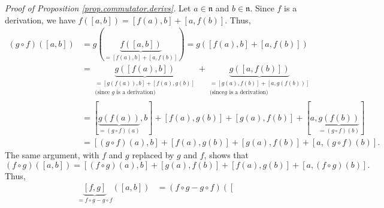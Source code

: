 \documentclass[etingof-lie.tex]{subfiles}
\begin{document}
\begin{verlong}
\textit{Proof of Proposition \ref{prop.commutator.derivs}.} Let $a\in
\mathfrak{n}$ and $b\in\mathfrak{n}$. Since $f$ is a derivation, we have
$f\left(  \left[  a,b\right]  \right)  =\left[  f\left(  a\right)  ,b\right]
+\left[  a,f\left(  b\right)  \right]  $. Thus,%
\begin{align*}
\left(  g\circ f\right)  \left(  \left[  a,b\right]  \right)   &  =g\left(
\underbrace{f\left(  \left[  a,b\right]  \right)  }_{=\left[  f\left(
a\right)  ,b\right]  +\left[  a,f\left(  b\right)  \right]  }\right)
=g\left(  \left[  f\left(  a\right)  ,b\right]  +\left[  a,f\left(  b\right)
\right]  \right) \\
&  =\underbrace{g\left(  \left[  f\left(  a\right)  ,b\right]  \right)
}_{\substack{=\left[  g\left(  f\left(  a\right)  \right)  ,b\right]  +\left[
f\left(  a\right)  ,g\left(  b\right)  \right]  \\\text{(since }g\text{ is a
derivation)}}}+\underbrace{g\left(  \left[  a,f\left(  b\right)  \right]
\right)  }_{\substack{=\left[  g\left(  a\right)  ,f\left(  b\right)  \right]
+\left[  a,g\left(  f\left(  b\right)  \right)  \right]  \\\text{(since
}g\text{ is a derivation)}}}\\
&  =\left[  \underbrace{g\left(  f\left(  a\right)  \right)  }_{=\left(
g\circ f\right)  \left(  a\right)  },b\right]  +\left[  f\left(  a\right)
,g\left(  b\right)  \right]  +\left[  g\left(  a\right)  ,f\left(  b\right)
\right]  +\left[  a,\underbrace{g\left(  f\left(  b\right)  \right)
}_{=\left(  g\circ f\right)  \left(  b\right)  }\right] \\
&  =\left[  \left(  g\circ f\right)  \left(  a\right)  ,b\right]  +\left[
f\left(  a\right)  ,g\left(  b\right)  \right]  +\left[  g\left(  a\right)
,f\left(  b\right)  \right]  +\left[  a,\left(  g\circ f\right)  \left(
b\right)  \right]  .
\end{align*}
The same argument, with $f$ and $g$ replaced by $g$ and $f$, shows that%
\[
\left(  f\circ g\right)  \left(  \left[  a,b\right]  \right)  =\left[  \left(
f\circ g\right)  \left(  a\right)  ,b\right]  +\left[  g\left(  a\right)
,f\left(  b\right)  \right]  +\left[  f\left(  a\right)  ,g\left(  b\right)
\right]  +\left[  a,\left(  f\circ g\right)  \left(  b\right)  \right]  .
\]
Thus,%
\begin{align*}
\underbrace{\left[  f,g\right]  }_{=f\circ g-g\circ f}\left(  \left[
a,b\right]  \right)   &  =\left(  f\circ g-g\circ f\right)  \left(  \left[

\end{align*}
\end{verlong}
\end{document}
